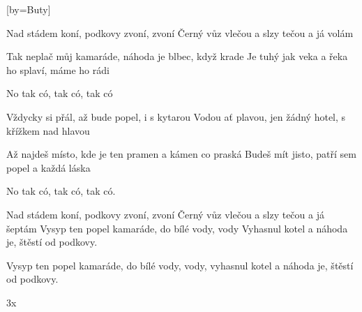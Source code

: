 [by={Buty}]

\beginverse{}
Nad stádem koní, podkovy zvoní, zvoní
Černý vůz vlečou a slzy tečou a já volám
\endverse{}

\beginverse{}
Tak neplač můj kamaráde, náhoda je blbec, když krade
Je tuhý jak veka a řeka ho splaví, máme ho rádi
\endverse{}

\beginchorus{}
No tak có, tak có, tak có
\endchorus{}

\beginverse{}
Vždycky si přál, až bude popel, i s kytarou
Vodou ať plavou, jen žádný hotel, s křížkem nad hlavou
\endverse{}

\beginverse{}
Až najdeš místo, kde je ten pramen a kámen co praská
Budeš mít jisto, patří sem popel a každá láska
\endverse{}

\beginchorus{}
No tak có, tak có, tak có.
\endchorus{}

\beginverse{}
Nad stádem koní, podkovy zvoní, zvoní
Černý vůz vlečou a slzy tečou a já šeptám
Vysyp ten popel kamaráde, do bílé vody, vody
 Vyhasnul kotel a náhoda je, štěstí od podkovy.
\endverse{}

\beginverse{}
Vysyp ten popel kamaráde, do bílé vody, vody,
vyhasnul kotel a náhoda je, štěstí od podkovy.
\endverse{}

\beginverse{}
3x
\endverse{}

\endsong{}
